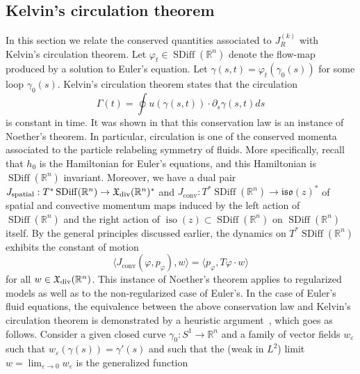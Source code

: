 \documentclass[12pt]{amsart}
\newcommand{\R}{\ensuremath{\mathbb{R}}}
\DeclareMathOperator{\SDiff}{SDiff}
\DeclareMathOperator{\iso}{iso}
\begin{document}
  \subsection{Kelvin's circulation theorem}
  \label{sec:Kelvin}
  In this section we relate the conserved quantities associated
  to $J_R^{(k)}$ with Kelvin's circulation theorem.
Let $\varphi_t \in \SDiff(\R^n)$ denote the flow-map
produced by a solution to Euler's equation.
Let $\gamma(s,t) = \varphi_t(\gamma_0(s))$ for some loop $\gamma_0(s)$.
Kelvin's circulation theorem states that the circulation
\begin{equation}\label{eq:Kelvin-circulation}
  \Gamma(t) = \oint u( \gamma(s,t) )  \cdot \partial_s \gamma(s,t) ds
\end{equation}
is constant in time.
It was shown in \cite{Arnold1966} that this conservation law
is an instance of Noether's theorem.
In particular, circulation is one of the conserved momenta
associated to the particle relabeling symmetry of fluids.
More specifically,
recall that $h_0$ is the Hamiltonian for Euler's equations,
and this Hamiltonian is $\SDiff(\R^n)$ invariant. Moreover, we have a dual pair
$J_\text{spatial}: T^*\SDiff(\R^n) \to \mathfrak{X}_{\rm div}(\R^n)^*$
and $J_\text{conv}: T^*\SDiff(\R^n) \to \mathfrak{iso}(z)^*$ of
spatial and convective momentum maps induced by
the left action of $\SDiff(\R^n)$ and the right action of
$\iso(z) \subset \SDiff(\R^n)$ on $\SDiff(\R^n)$ itself.
By the general principles discussed earlier, the dynamics on $T^*\SDiff(\R^n)$ exhibits the constant of motion
\begin{equation}\label{eq:abstract-circulation}
  \langle J_\text{conv}(\varphi,p_\varphi) , w \rangle
  = \langle p_\varphi , T\varphi \cdot w \rangle
\end{equation}
for all $w \in \mathfrak{X}_{\rm div}(\R^n)$.  
This instance of Noether's theorem applies to regularized models as well as to the non-regularized case of Euler's.
In the case of Euler's fluid equations, the equivalence between the above conservation law
and Kelvin's circulation theorem is demonstrated by a heuristic
argument~\cite[Ch~1, Thm~5.5]{ArnoldKhesin1998}, which goes as follows. 
Consider a given closed curve $\gamma_0\colon S^1 \to \R^n$ and a family
of vector fields $w_\varepsilon$ such that $w_\varepsilon(\gamma(s)) = \gamma'(s)$
and such that the (weak in $L^2$) limit $w = \lim_{\varepsilon \to 0} w_\varepsilon$ is the generalized function
\end{document}

